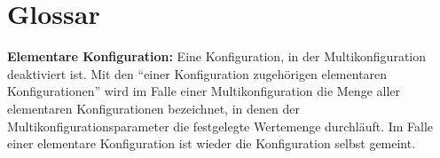 \documentclass[parskip=full,11pt]{scrartcl}
\begin{document}
\section{Glossar}
\textbf{Elementare Konfiguration:}
Eine Konfiguration, in der Multikonfiguration deaktiviert ist. Mit den \enquote{einer Konfiguration zugehörigen elementaren Konfigurationen} wird im Falle einer Multikonfiguration die Menge aller elementaren Konfigurationen bezeichnet, in denen der Multikonfigurationsparameter die festgelegte Wertemenge durchläuft. Im Falle einer elementare Konfiguration ist wieder die Konfiguration selbst gemeint.
\end{document}
